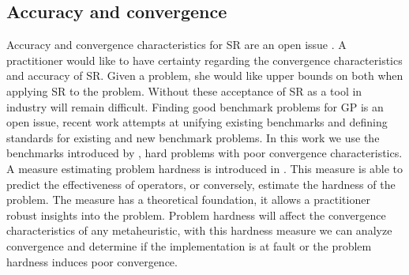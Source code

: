 \subsection{Accuracy and convergence}
Accuracy and convergence characteristics for SR are an open issue \citep{SRAccuracy, SRAccur, SRBaseline}. A practitioner would like to have certainty regarding the convergence characteristics and accuracy of SR. Given a problem, she would like upper bounds on both when applying SR to the problem. Without these acceptance of SR as a tool in industry will remain difficult.
Finding good benchmark problems for GP is an open issue, recent work \citep{GPBenchmarks} attempts at unifying existing benchmarks and defining standards for existing and new benchmark problems. In this work we use the benchmarks introduced by \cite{SRAccuracy}, hard problems with poor convergence characteristics.
A measure estimating problem hardness is introduced in \citep{GPHardness}. This measure is able to predict the effectiveness of operators, or conversely, estimate the hardness of the problem. The measure has a theoretical foundation, it allows a practitioner robust insights into the problem. Problem hardness will affect the convergence characteristics of any metaheuristic, with this hardness measure we can analyze convergence and determine if the implementation is at fault or the problem hardness induces poor convergence.
